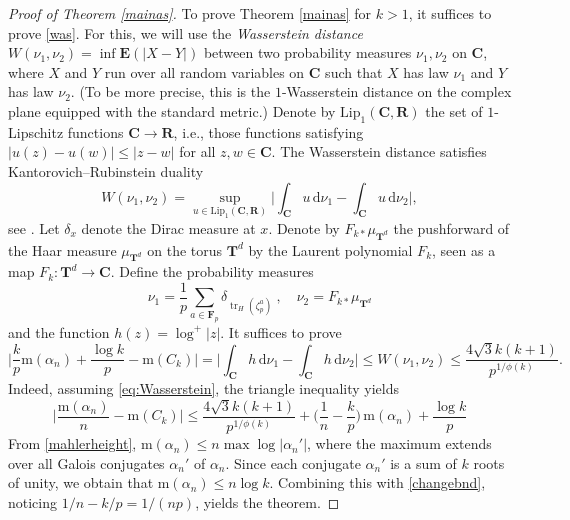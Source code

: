 \documentclass[12pt,reqno]{amsart}
\theoremstyle{definition}
\theoremstyle{plain}
\theoremstyle{definition}
\newcommand{\R}{\mathbf{R}}
\newcommand{\FF}{\mathbf{F}}
\newcommand{\Cc}{\mathbf{C}}
\newcommand{\T}{\mathbf{T}}
\newcommand\m{\mathrm{m}}
\DeclareMathOperator{\tr}{tr}
\renewcommand{\leq}{\leqslant}
\renewcommand{\d}{\mathrm{d}}
\begin{document}
\begin{proof}[Proof of Theorem \ref{mainas}] To prove Theorem \ref{mainas} for $k>1$, it suffices to prove \eqref{was}. For this, we will use the \emph{Wasserstein distance} $W(\nu_1,\nu_2) = \inf \mathbf{E}(|X-Y|)$ between two probability measures $\nu_1, \nu_2$ on $\Cc$, where $X$ and $Y$ run over all random variables on $\Cc$ such that $X$ has law $\nu_1$ and $Y$ has law $\nu_2$. (To be more precise, this is the $1$-Wasserstein distance on the complex plane equipped with the standard metric.) Denote by $\mathrm{Lip_1}(\Cc,\R)$ the set of $1$-Lipschitz functions $\Cc \to \R$, i.e.,  those functions satisfying $|u(z)-u(w)| \leq |z-w|$ for all $z,w \in \Cc$.
The Wasserstein distance satisfies Kantorovich--Rubinstein duality 
\begin{equation} 
\label{w1} 
W(\nu_1,\nu_2) = \sup_{u \in \mathrm{Lip_1}(\Cc,\R)} \Big| \int_\Cc u \, \d \nu_1 - \int_\Cc u \, \d \nu_2 \Big|,
\end{equation}
see \cite[Theorem~1.2(6)]{KU}.
Let $\delta_x$ denote the Dirac measure at $x$. Denote by $F_{k\ast} \mu_{\T^d}$ the pushforward of the Haar measure $\mu_{\T^d}$ on the torus $\T^d$ by the Laurent polynomial $F_k$, seen as a map $F_k \colon \T^d \rightarrow \Cc$. Define the probability measures
\begin{equation*}
\nu_1 = \frac{1}{p} \sum_{a \in \FF_p} \delta_{ \tr_H(\zeta_p^a)} \ , \quad \nu_2 = F_{k\ast} \mu_{\T^d}
\end{equation*}
and the function $h(z)=\log^+|z|$. It suffices to prove
\begin{equation}
\label{eq:Wasserstein}
\Big|\frac{k}{p} \m(\alpha_n) + \frac{\log{k}}{p} - \m(C_k)\Big| = \Big| \int_\Cc h \, \d \nu_1 - \int_\Cc h \, \d \nu_2 \Big| \leq W(\nu_1, \nu_2) \leq \frac{4\sqrt{3} k(k+1)}{p^{1/\phi(k)}}.
\end{equation}
Indeed, assuming \eqref{eq:Wasserstein}, the triangle inequality yields
\begin{equation} 
\label{changebnd} 
 \Big| \frac{\m(\alpha_n)}{n} - \m(C_k) \Big|  \leq \frac{4\sqrt{3} k(k+1)}{p^{1/\phi(k)}} +\Big(\frac1n-\frac{k}{p}\Big)\, \m(\alpha_n) + \frac{\log{k}}{p} 
\end{equation} 
From \eqref{mahlerheight}, $\m(\alpha_n) \leq n  \max \log |\alpha_n'|$, where the maximum extends over all Galois conjugates $\alpha_n'$ of $\alpha_n$. Since each conjugate $\alpha_n'$ is a sum of $k$ roots of unity, we obtain that $\m(\alpha_n) \leq n \log{k}$. Combining this with \eqref{changebnd}, noticing $1/n-k/p=1/(np)$, yields the theorem.



\end{proof}
\end{document}
